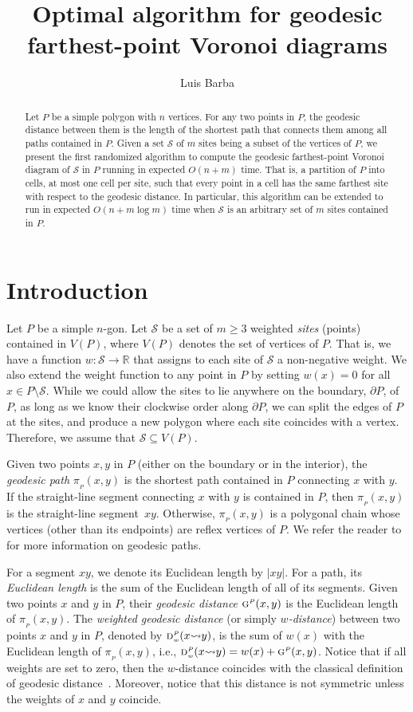 \documentclass[a4paper,UKenglish]{socg-lipics-v2018}
\title{Optimal algorithm for geodesic farthest-point Voronoi diagrams}
\author{Luis Barba}{Department of Computer Science, ETH Z\"urich, Switzerland}{luis.barba@inf.ethz.ch}{}{}
\newcommand{\s}{\mathcal S}
\newcommand{\g}[3][P]{\ensuremath{\textsc{g}^{\scriptscriptstyle #1}(#2, #3)}}
\newcommand{\dd}[3][P]{\ensuremath{\textsc{d}_{\scriptscriptstyle w}^{\scriptscriptstyle #1}(#2 {\leadsto} #3)}}
\newcommand{\p}[3][P]{\ensuremath{\pi_{_{#1}}(#2, #3)}}
\begin{document}
\maketitle

\begin{abstract}
Let $P$ be a simple polygon with $n$ vertices.
For any two points in $P$, the geodesic distance between them is the length of the shortest path that connects them among all paths contained in $P$. 
Given a set $\s$ of $m$ sites being a subset of  the vertices of $P$, we present the first randomized algorithm to compute the geodesic farthest-point Voronoi diagram of $\s$ in $P$ running in expected $O(n + m)$ time. 
That is, a partition of $P$ into cells, at most one cell per site, such that every point in a cell has the same farthest site with respect to the geodesic distance. 
In particular, this algorithm can be extended to run in expected $O(n + m\log m)$ time when $\s$ is an arbitrary set of $m$ sites contained in $P$.
\end{abstract}



\section{Introduction}
Let $P$ be a simple $n$-gon.
Let $\s$ be a set of $m\geq 3$ weighted \emph{sites} (points) contained in $V(P)$, where $V(P)$ denotes the set of vertices of $P$. 
That is, we have a function $w:\s\to \mathbb{R}$ that assigns to each site of $\s$ a non-negative weight. 
We also extend the weight function to any point in $P$ by setting $w(x) = 0$ for all $x\in P\setminus \s$.
While we could allow the sites to lie anywhere on the boundary, $\partial P$, of $P$, as long as we know their clockwise order along $\partial P$, we can split the edges of $P$ at the sites, and produce a new polygon where each site coincides with a vertex. Therefore, we assume that $\s\subseteq V(P)$.

Given two points $x,y$ in $P$ (either on the boundary or in the interior), the \emph{geodesic path} $\p{x}{y}$ is the shortest path contained in $P$ connecting $x$ with $y$. If the straight-line segment connecting $x$ with $y$ is contained in $P$, then $\p{x}{y}$ is the straight-line segment~$xy$. 
Otherwise, $\p{x}{y}$ is a polygonal chain whose vertices (other than its endpoints) are  reflex vertices of $P$. 
We refer the reader to~\cite{m-gspno-00} for more information on geodesic paths.

For a segment $xy$, we denote its Euclidean length by $|xy|$. For a path, its \emph{Euclidean length} is the sum of the Euclidean length of all of its segments. Given two points $x$ and $y$ in $P$, their \emph{geodesic distance} $\g{x}{y}$ is the Euclidean length of $\p{x}{y}$.
The \emph{weighted geodesic distance} (or simply \emph{$w$-distance}) between two points $x$ and $y$ in $P$, denoted by $\dd{x}{y}$, is the sum of $w(x)$ with the Euclidean length of $\p{x}{y}$, i.e., $\dd{x}{y} = w(x) + \g{x}{y}$. Notice that if all weights are set to zero, then the $w$-distance coincides with the classical definition of geodesic distance~\cite{m-gspno-00}. 
Moreover, notice that this distance is not symmetric unless the weights of $x$ and $y$ coincide. 
\end{document}
